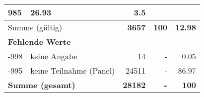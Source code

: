 \begin{longtable}{lXrrr}
       \num{985} &
       \num[round-mode=places,round-precision=2]{26.93} &
         \num[round-mode=places,round-precision=2]{3.5} \\
     \midrule
     \multicolumn{2}{l}{Summe (gültig)} &
       \textbf{\num{3657}} &
     \textbf{100} &
       \textbf{\num[round-mode=places,round-precision=2]{12.98}} \\
     \multicolumn{5}{l}{\textbf{Fehlende Werte}}\\
       -998 &
       keine Angabe &
         \num{14} &
        - &
         \num[round-mode=places,round-precision=2]{0.05} \\
       -995 &
       keine Teilnahme (Panel) &
         \num{24511} &
        - &
         \num[round-mode=places,round-precision=2]{86.97} \\
     \midrule
     \multicolumn{2}{l}{\textbf{Summe (gesamt)}} &
          \textbf{\num{28182}} &
        \textbf{-} &
        \textbf{100} \\
     \bottomrule
     \end{longtable}
     

